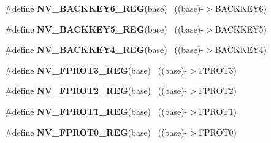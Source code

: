 \begin{DoxyCompactItemize}
\item 
\hypertarget{group___n_v___register___accessor___macros_ga9d64e9e2568804d0cf1de4cb5a1d3f1f}{}\#define {\bfseries N\+V\+\_\+\+B\+A\+C\+K\+K\+E\+Y6\+\_\+\+R\+E\+G}(base)                                    ~((base)-\/$>$B\+A\+C\+K\+K\+E\+Y6)\label{group___n_v___register___accessor___macros_ga9d64e9e2568804d0cf1de4cb5a1d3f1f}

\item 
\hypertarget{group___n_v___register___accessor___macros_gaeeb967dc21f8077cef911eae743d7f12}{}\#define {\bfseries N\+V\+\_\+\+B\+A\+C\+K\+K\+E\+Y5\+\_\+\+R\+E\+G}(base)                                    ~((base)-\/$>$B\+A\+C\+K\+K\+E\+Y5)\label{group___n_v___register___accessor___macros_gaeeb967dc21f8077cef911eae743d7f12}

\item 
\hypertarget{group___n_v___register___accessor___macros_gae867c53e6918c6a7c16ccba9ee512dc1}{}\#define {\bfseries N\+V\+\_\+\+B\+A\+C\+K\+K\+E\+Y4\+\_\+\+R\+E\+G}(base)                                    ~((base)-\/$>$B\+A\+C\+K\+K\+E\+Y4)\label{group___n_v___register___accessor___macros_gae867c53e6918c6a7c16ccba9ee512dc1}

\item 
\hypertarget{group___n_v___register___accessor___macros_gad8e367bb2e9aae8570a3736ec8a4aee9}{}\#define {\bfseries N\+V\+\_\+\+F\+P\+R\+O\+T3\+\_\+\+R\+E\+G}(base)                                        ~((base)-\/$>$F\+P\+R\+O\+T3)\label{group___n_v___register___accessor___macros_gad8e367bb2e9aae8570a3736ec8a4aee9}

\item 
\hypertarget{group___n_v___register___accessor___macros_gae06ab638a7b4ad4757c89118971127d0}{}\#define {\bfseries N\+V\+\_\+\+F\+P\+R\+O\+T2\+\_\+\+R\+E\+G}(base)                                        ~((base)-\/$>$F\+P\+R\+O\+T2)\label{group___n_v___register___accessor___macros_gae06ab638a7b4ad4757c89118971127d0}

\item 
\hypertarget{group___n_v___register___accessor___macros_ga1f9fafcb15ed5d1b27020f5b04edfe00}{}\#define {\bfseries N\+V\+\_\+\+F\+P\+R\+O\+T1\+\_\+\+R\+E\+G}(base)                                        ~((base)-\/$>$F\+P\+R\+O\+T1)\label{group___n_v___register___accessor___macros_ga1f9fafcb15ed5d1b27020f5b04edfe00}

\item 
\hypertarget{group___n_v___register___accessor___macros_ga04dc6fb630cffc56b5fff1847704cc53}{}\#define {\bfseries N\+V\+\_\+\+F\+P\+R\+O\+T0\+\_\+\+R\+E\+G}(base)                                        ~((base)-\/$>$F\+P\+R\+O\+T0)\label{group___n_v___register___accessor___macros_ga04dc6fb630cffc56b5fff1847704cc53}


\end{DoxyCompactItemize}
